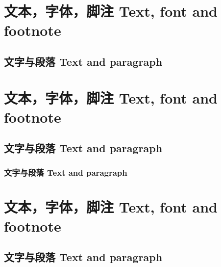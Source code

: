 \documentclass[draft,twoside]{fduthesis}
\begin{document}
\chapter{文本，字体，脚注 \quad Text, font and footnote}
\section{文字与段落 Text and paragraph}
\zhlipsum[1-4]

\chapter{文本，字体，脚注 \quad Text, font and footnote}

\section{文字与段落 Text and paragraph}

\subsection{文字与段落 Text and paragraph}
\zhlipsum[1-2]

\chapter{文本，字体，脚注 \quad Text, font and footnote}

{}
\section{文字与段落 Text and paragraph}
\zhlipsum[1-2]
\end{document}

